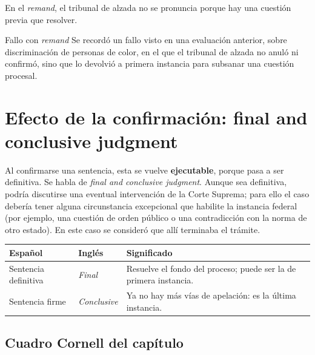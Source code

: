 \documentclass[12pt,oneside]{book}
\begin{document}
En el \textit{remand}, el tribunal de alzada no se pronuncia porque hay una cuestión previa que resolver.

\begin{example}{Fallo con \textit{remand}}
Se recordó un fallo visto en una evaluación anterior, sobre discriminación de personas de color, en el que el tribunal de alzada no anuló ni confirmó, sino que lo devolvió a primera instancia para subsanar una cuestión procesal.
\end{example}

\section{Efecto de la confirmación: final and conclusive judgment}

Al confirmarse una sentencia, esta se vuelve \textbf{ejecutable}, porque pasa a ser definitiva. Se habla de \textit{final and conclusive judgment}. Aunque sea definitiva, podría discutirse una eventual intervención de la Corte Suprema; para ello el caso debería tener alguna circunstancia excepcional que habilite la instancia federal (por ejemplo, una cuestión de orden público o una contradicción con la norma de otro estado). En este caso se consideró que allí terminaba el trámite.

\begin{table}[H]
\centering
\begin{tabularx}{\textwidth}{
    >{\raggedright\arraybackslash}p{}
    >{\raggedright\arraybackslash}p{}
    >{\raggedright\arraybackslash}X
}
\toprule
\textbf{Español} & \textbf{Inglés} & \textbf{Significado} \\
\midrule
Sentencia definitiva & \textit{Final} & Resuelve el fondo del proceso; puede ser la de primera instancia. \\
Sentencia firme & \textit{Conclusive} & Ya no hay más vías de apelación: es la última instancia. \\
\bottomrule
\end{tabularx}
\end{table}

\subsection*{Cuadro Cornell del capítulo}
\end{document}
